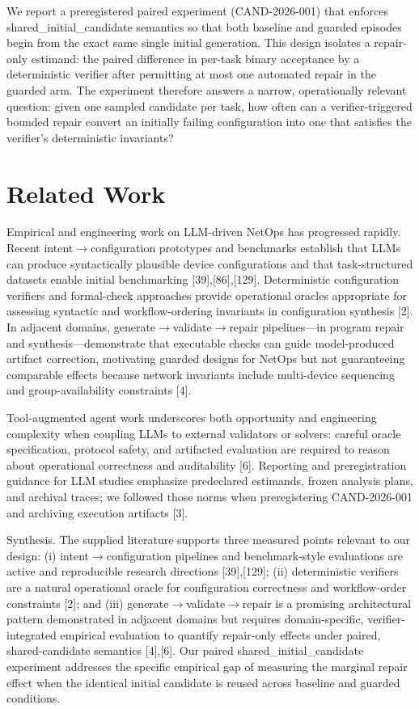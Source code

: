 \documentclass[conference]{IEEEtran}
\begin{document}
We report a preregistered paired experiment (CAND-2026-001) that enforces shared\_initial\_candidate semantics so that both baseline and guarded episodes begin from the exact same single initial generation. This design isolates a repair-only estimand: the paired difference in per-task binary acceptance by a deterministic verifier after permitting at most one automated repair in the guarded arm. The experiment therefore answers a narrow, operationally relevant question: given one sampled candidate per task, how often can a verifier-triggered bounded repair convert an initially failing configuration into one that satisfies the verifier's deterministic invariants?

\section{Related Work}
Empirical and engineering work on LLM-driven NetOps has progressed rapidly. Recent intent\ensuremath{\rightarrow}configuration prototypes and benchmarks establish that LLMs can produce syntactically plausible device configurations and that task-structured datasets enable initial benchmarking [39],[86],[129]. Deterministic configuration verifiers and formal-check approaches provide operational oracles appropriate for assessing syntactic and workflow-ordering invariants in configuration synthesis [2]. In adjacent domains, generate\ensuremath{\rightarrow}validate\ensuremath{\rightarrow}repair pipelines---in program repair and synthesis---demonstrate that executable checks can guide model-produced artifact correction, motivating guarded designs for NetOps but not guaranteeing comparable effects because network invariants include multi-device sequencing and group-availability constraints [4].

Tool-augmented agent work underscores both opportunity and engineering complexity when coupling LLMs to external validators or solvers: careful oracle specification, protocol safety, and artifacted evaluation are required to reason about operational correctness and auditability [6]. Reporting and preregistration guidance for LLM studies emphasize predeclared estimands, frozen analysis plans, and archival traces; we followed those norms when preregistering CAND-2026-001 and archiving execution artifacts [3].

Synthesis. The supplied literature supports three measured points relevant to our design: (i) intent\ensuremath{\rightarrow}configuration pipelines and benchmark-style evaluations are active and reproducible research directions [39],[129]; (ii) deterministic verifiers are a natural operational oracle for configuration correctness and workflow-order constraints [2]; and (iii) generate\ensuremath{\rightarrow}validate\ensuremath{\rightarrow}repair is a promising architectural pattern demonstrated in adjacent domains but requires domain-specific, verifier-integrated empirical evaluation to quantify repair-only effects under paired, shared-candidate semantics [4],[6]. Our paired shared\_initial\_candidate experiment addresses the specific empirical gap of measuring the marginal repair effect when the identical initial candidate is reused across baseline and guarded conditions.
\end{document}
